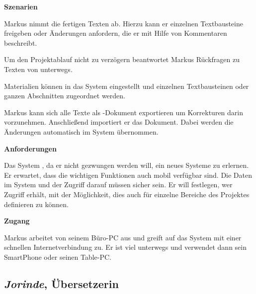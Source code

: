 \begin{multicols}{2}
\textbf{Szenarien}

Markus nimmt die fertigen Texten ab. Hierzu kann er einzelnen Textbausteine freigeben oder Änderungen anfordern, die er mit Hilfe von Kommentaren beschreibt. 

Um den Projektablauf nicht zu verzögern beantwortet Markus Rückfragen zu Texten von unterwegs.

Materialien können in das System eingestellt und einzelnen Textbausteinen oder ganzen Abschnitten zugeordnet werden.

Markus kann sich alle Texte als -Dokument exportieren um Korrekturen darin vorzunehmen. Anschließend importiert er das Dokument. Dabei werden die Änderungen automatisch im System übernommen.

\textbf{Anforderungen}

Das System , da er nicht gezwungen werden will, ein neues Systeme zu erlernen. Er erwartet, dass die wichtigen Funktionen auch mobil verfügbar sind. Die Daten im System und der Zugriff darauf müssen sicher sein. Er will festlegen, wer Zugriff erhält, mit der Möglichkeit, dies auch für einzelne Bereiche des Projektes definieren zu können.

\textbf{Zugang}

Markus arbeitet von seinem Büro-PC aus und greift auf das System mit einer schnellen Internetverbindung zu. Er ist viel unterwegs und verwendet dann sein SmartPhone oder seinen Table-PC.

\end{multicols}

\pagebreak

\subsection{\emph{Jorinde}, Übersetzerin}\label{p:jorinde}

